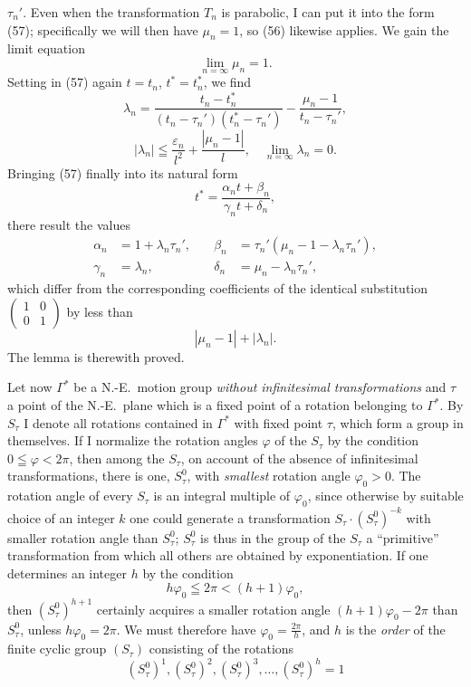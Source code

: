\documentclass{article}
\begin{document}
$\tau_n'$. Even when the transformation $T_n$ is parabolic, I can put it into the form (57); specifically we will then have $\mu_n = 1$, so (56) likewise applies. We gain the limit equation
\[ \lim_{n = \infty} \mu_n = 1. \]
Setting in (57) again $t = t_n$, $t^* = t_n^*$, we find
\[ \lambda_n = \frac{t_n - t_n^*}{(t_n - \tau_n')(t_n^* - \tau_n')} - \frac{\mu_n - 1}{t_n - \tau_n'}, \]
\[ |\lambda_n| \leqq \frac{\varepsilon_n}{l^2} + \frac{|\mu_n - 1|}{l}, \quad \lim_{n = \infty} \lambda_n = 0. \]
Bringing (57) finally into its natural form
\[ t^* = \frac{\alpha_n t + \beta_n}{\gamma_n t + \delta_n}, \]
there result the values
\[ \begin{aligned} \alpha_n &= 1 + \lambda_n \tau_n', &\quad \beta_n &= \tau_n'(\mu_n - 1 - \lambda_n \tau_n'), \\ \gamma_n &= \lambda_n, &\quad \delta_n &= \mu_n - \lambda_n \tau_n', \end{aligned} \]
which differ from the corresponding coefficients of the identical substitution $\begin{pmatrix} 1 & 0 \\ 0 & 1 \end{pmatrix}$ by less than
\[ |\mu_n - 1| + |\lambda_n|. \]
The lemma is therewith proved.

Let now $\varGamma^*$ be a N.-E.\ motion group \emph{without infinitesimal transformations} and $\tau$ a point of the N.-E.\ plane which is a fixed point of a rotation belonging to $\varGamma^*$. By $S_\tau$ I denote all rotations contained in $\varGamma^*$ with fixed point $\tau$, which form a group in themselves. If I normalize the rotation angles $\varphi$ of the $S_\tau$ by the condition $0 \leqq \varphi < 2\pi$, then among the $S_\tau$, on account of the absence of infinitesimal transformations, there is one, $S_\tau^0$, with \emph{smallest} rotation angle $\varphi_0 > 0$. The rotation angle of every $S_\tau$ is an integral multiple of $\varphi_0$, since otherwise by suitable choice of an integer $k$ one could generate a transformation $S_\tau \cdot (S_\tau^0)^{-k}$ with smaller rotation angle than $S_\tau^0$; $S_\tau^0$ is thus in the group of the $S_\tau$ a ``primitive'' transformation from which all others are obtained by exponentiation. If one determines an integer $h$ by the condition
\[ h\varphi_0 \leqq 2\pi < (h + 1)\varphi_0, \]
then $(S_\tau^0)^{h+1}$ certainly acquires a smaller rotation angle $(h + 1)\varphi_0 - 2\pi$ than $S_\tau^0$, unless $h\varphi_0 = 2\pi$. We must therefore have $\varphi_0 = \frac{2\pi}{h}$, and $h$ is the \emph{order} of the finite cyclic group $(S_\tau)$ consisting of the rotations
\[ (S_\tau^0)^1, (S_\tau^0)^2, (S_\tau^0)^3, \dots, (S_\tau^0)^h = 1 \]
\end{document}
